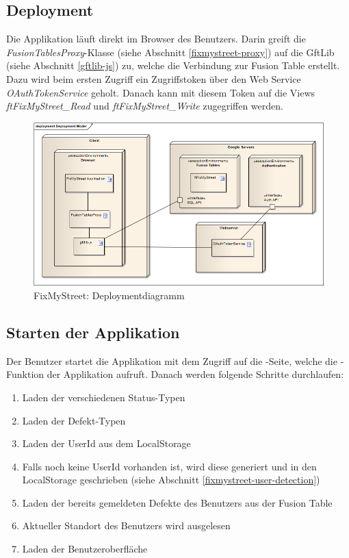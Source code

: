 \subsection{Deployment}
Die Applikation läuft direkt im Browser des Benutzers. Darin greift die \emph{FusionTablesProxy}-Klasse (siehe Abschnitt \ref{fixmystreet-proxy}) auf die GftLib (siehe Abschnitt \ref{gftlib-js}) zu, welche die Verbindung zur Fusion Table erstellt. Dazu wird beim ersten Zugriff ein Zugriffstoken über den Web Service \emph{OAuthTokenService} geholt. Danach kann mit diesem Token auf die Views \emph{ftFixMyStreet\_Read} und \emph{ftFixMyStreet\_Write} zugegriffen werden.

\begin{figure}[H]
	\centering
	\includegraphics[width=\textwidth]{images/usecase2-fixmystreet/uml/fixmystreet-deploymentmodel}
	\caption{FixMyStreet: Deploymentdiagramm}
	\label{fixmystreet-deploymentmodel}
\end{figure}

\subsection{Starten der Applikation}
Der Benutzer startet die Applikation mit dem Zugriff auf die -Seite, welche die -Funktion der Applikation aufruft. Danach werden folgende Schritte durchlaufen:

\begin{enumerate}
\item Laden der verschiedenen Status-Typen
\item Laden der Defekt-Typen
\item Laden der UserId aus dem LocalStorage
\item Falls noch keine UserId vorhanden ist, wird diese generiert und in den LocalStorage geschrieben (siehe Abschnitt \ref{fixmystreet-user-detection})
\item Laden der bereits gemeldeten Defekte des Benutzers aus der Fusion Table
\item Aktueller Standort des Benutzers wird ausgelesen
\item Laden der Benutzeroberfläche
\end{enumerate}

